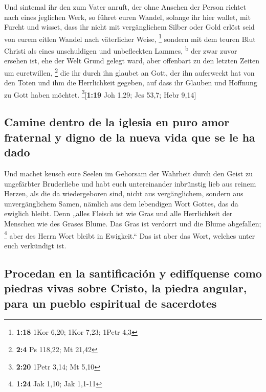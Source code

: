  Und sintemal ihr den zum Vater anruft, der ohne Ansehen
der Person richtet nach eines jeglichen Werk, so führet euren Wandel,
solange ihr hier wallet, mit Furcht  und wisset, dass ihr
nicht mit vergänglichem Silber oder Gold erlöst seid von eurem eitlen
Wandel nach väterlicher Weise, \footnote{\textbf{1:18} 1Kor 6,20; 1Kor
  7,23; 1Petr 4,3}  sondern mit dem teuren Blut Christi
als eines unschuldigen und unbefleckten Lammes, \textsuperscript{b}
 der zwar zuvor ersehen ist, ehe der Welt Grund gelegt
ward, aber offenbart zu den letzten Zeiten um euretwillen, \footnote{\textbf{2:4}
  Ps 118,22; Mt 21,42}  die ihr durch ihn glaubet an
Gott, der ihn auferweckt hat von den Toten und ihm die Herrlichkeit
gegeben, auf dass ihr Glauben und Hoffnung zu Gott haben möchtet.
\footnote{\textbf{2:20} 1Petr 3,14; Mt 5,10}{[}\textbf{1:19} Joh 1,29;
Jes 53,7; Hebr 9,14{]}

\hypertarget{camine-dentro-de-la-iglesia-en-puro-amor-fraternal-y-digno-de-la-nueva-vida-que-se-le-ha-dado}{%
\subsection{Camine dentro de la iglesia en puro amor fraternal y digno
de la nueva vida que se le ha
dado}\label{camine-dentro-de-la-iglesia-en-puro-amor-fraternal-y-digno-de-la-nueva-vida-que-se-le-ha-dado}}

 Und machet keusch eure Seelen im Gehorsam der Wahrheit
durch den Geist zu ungefärbter Bruderliebe und habt euch untereinander
inbrünstig lieb aus reinem Herzen,  als die da
wiedergeboren sind, nicht aus vergänglichem, sondern aus unvergänglichem
Samen, nämlich aus dem lebendigen Wort Gottes, das da ewiglich bleibt.
 Denn „alles Fleisch ist wie Gras und alle Herrlichkeit
der Menschen wie des Grases Blume. Das Gras ist verdorrt und die Blume
abgefallen; \footnote{\textbf{1:24} Jak 1,10; Jak 1,1-11}
 aber des Herrn Wort bleibt in Ewigkeit.`` Das ist aber
das Wort, welches unter euch verkündigt ist.

\hypertarget{procedan-en-la-santificaciuxf3n-y-edifuxedquense-como-piedras-vivas-sobre-cristo-la-piedra-angular-para-un-pueblo-espiritual-de-sacerdotes}{%
\subsection{Procedan en la santificación y edifíquense como piedras
vivas sobre Cristo, la piedra angular, para un pueblo espiritual de
sacerdotes}\label{procedan-en-la-santificaciuxf3n-y-edifuxedquense-como-piedras-vivas-sobre-cristo-la-piedra-angular-para-un-pueblo-espiritual-de-sacerdotes}}

